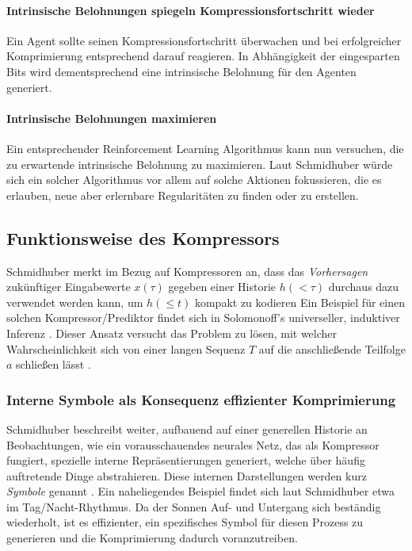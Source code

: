 \paragraph{Intrinsische Belohnungen spiegeln Kompressionsfortschritt wieder}
Ein Agent sollte seinen Kompressionsfortschritt überwachen und bei erfolgreicher Komprimierung entsprechend darauf reagieren. In Abhängigkeit der eingesparten Bits wird dementsprechend eine intrinsische Belohnung für den Agenten generiert.

\paragraph{Intrinsische Belohnungen maximieren}
Ein entsprechender Reinforcement Learning Algorithmus kann nun versuchen, die zu erwartende intrinsische Belohnung zu maximieren. Laut Schmidhuber würde sich ein solcher Algorithmus vor allem auf solche Aktionen fokussieren, die es erlauben, neue aber erlernbare Regularitäten zu finden oder zu erstellen.


\subsection{Funktionsweise des Kompressors}
\label{sec:Kompressor}
Schmidhuber merkt im Bezug auf Kompressoren an, dass das \emph{Vorhersagen} zukünftiger Eingabewerte \(x(\tau)\) gegeben einer Historie \(h(<\tau)\) durchaus dazu verwendet werden kann, um \(h(\leq t)\) kompakt zu kodieren \cite[p.~18]{curiosity_schmidhuber}
Ein Beispiel für einen solchen Kompressor/Prediktor findet sich in Solomonoff's universeller, induktiver Inferenz \cite[p.~18]{curiosity_schmidhuber}. 
Dieser Ansatz versucht das Problem zu lösen, mit welcher Wahrscheinlichkeit sich von einer langen Sequenz \(T\) auf die anschließende Teilfolge \(a\) schließen lässt \cite{SOLOMONOFF19641}.

\subsubsection{Interne Symbole als Konsequenz effizienter Komprimierung}
Schmidhuber beschreibt weiter, aufbauend auf einer generellen Historie an Beobachtungen, wie ein vorausschauendes neurales Netz, das als Kompressor fungiert, spezielle interne Repräsentierungen generiert, welche über häufig auftretende Dinge abstrahieren. Diese internen Darstellungen werden kurz \emph{Symbole} genannt \cite[p.~6]{curiosity_schmidhuber}. Ein naheliegendes Beispiel findet sich laut Schmidhuber etwa im Tag/Nacht-Rhythmus. Da der Sonnen Auf- und Untergang sich beständig wiederholt, ist es effizienter, ein spezifisches Symbol für diesen Prozess zu generieren und die Komprimierung dadurch voranzutreiben.


